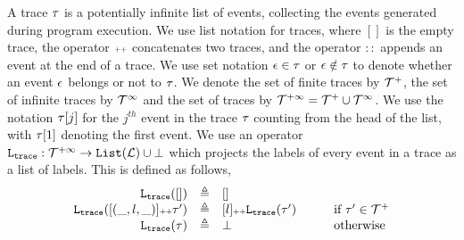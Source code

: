 A trace $\mathtt{\tau}$ is a potentially infinite list of events, 
collecting the events generated  during program execution. 
We use list notation for traces, where $[]$ is the empty trace,
the operator ${\scriptscriptstyle ++}$ concatenates two traces, and the operator $::$ appends an event at the end of a trace. We use set notation $\mathtt{\epsilon} \in \mathtt{\tau}$ or $\mathtt{\epsilon} \notin \mathtt{\tau}$ to denote whether an event $\mathtt{\epsilon}$ belongs or not to $\mathtt{\tau}$.
We denote the set of finite traces by $\mathcal{T}^{+}$, the set of infinite traces by $\mathcal{T}^{\infty}$ and the set of traces by $\mathcal{T}^{+\infty} = \mathcal{T}^{+} \cup \mathcal{T}^{\infty}$.
We use the notation $\mathtt{\tau}[j]$ for the $j^{th}$ event in the trace $\mathtt{\tau}$ counting from the head 
of the list, with $\mathtt{\tau}[1]$ denoting the first event.
%
We use an operator $\mathtt{L}_{\mathtt{{trace}}}: \mathcal{T}^{+\infty} \to \mathtt{List}(\mathcal{L})\cup \bot$ which projects the labels of every event in a trace as a list of labels. This is defined as follows,
%
\[
\begin{array}{rcll}
\mathtt{L}_{\mathtt{{trace}}}([]) &\triangleq & [] &\qquad  
\\ 
\mathtt{L}_{\mathtt{{trace}}}([(\_, l, \_)] {\scriptscriptstyle ++} \mathtt{\tau}') &\triangleq & [l] {\scriptscriptstyle ++} \mathtt{L}_{\mathtt{{trace}}}(\mathtt{\tau}') &\qquad  \mbox{if}\ \mathtt{\tau}'\in\mathcal{T}^{+}
\\
\mathtt{L}_{\mathtt{{trace}}}(\tau) &\triangleq & \bot  &\qquad  \mbox{otherwise}
\end{array}
\]
%
